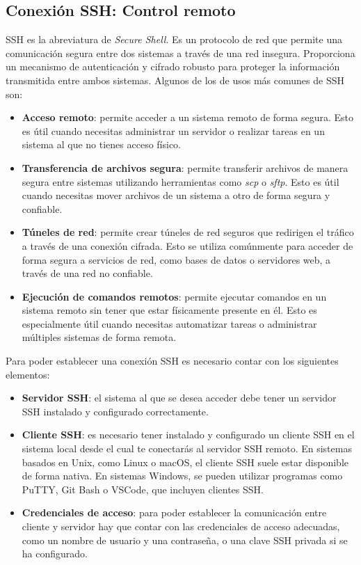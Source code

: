     \subsection{Conexión SSH: Control remoto}
    SSH \cite{wiki:ssh} es la abreviatura de \textit{Secure Shell}. Es un protocolo de red que permite una comunicación segura entre dos sistemas a través de una red insegura. Proporciona un mecanismo de autenticación y cifrado robusto para proteger la información transmitida entre ambos sistemas. Algunos de los de usos más comunes de SSH son:
    \begin{itemize}
        \item \textbf{Acceso remoto}: permite acceder a un sistema remoto de forma segura. Esto es útil cuando necesitas administrar un servidor o realizar tareas en un sistema al que no tienes acceso físico.
        \item \textbf{Transferencia de archivos segura}: permite transferir archivos de manera segura entre sistemas utilizando herramientas como \textit{scp} o \textit{sftp}. Esto es útil cuando necesitas mover archivos de un sistema a otro de forma segura y confiable.
        \item \textbf{Túneles de red}: permite crear túneles de red seguros que redirigen el tráfico a través de una conexión cifrada. Esto se utiliza comúnmente para acceder de forma segura a servicios de red, como bases de datos o servidores web, a través de una red no confiable. 
        \item \textbf{Ejecución de comandos remotos}: permite ejecutar comandos en un sistema remoto sin tener que estar físicamente presente en él. Esto es especialmente útil cuando necesitas automatizar tareas o administrar múltiples sistemas de forma remota.
    \end{itemize}
    Para poder establecer una conexión SSH es necesario contar con los siguientes elementos:
    \begin{itemize}
        \item \textbf{Servidor SSH}: el sistema al que se desea acceder debe tener un servidor SSH instalado y configurado correctamente.
        \item \textbf{Cliente SSH}: es necesario tener instalado y configurado un cliente SSH en el sistema local desde el cual te conectarás al servidor SSH remoto. En sistemas basados en Unix, como Linux o macOS, el cliente SSH suele estar disponible de forma nativa. En sistemas Windows, se pueden utilizar programas como PuTTY, Git Bash o VSCode, que incluyen clientes SSH. 
        \item \textbf{Credenciales de acceso}: para poder establecer la comunicación entre cliente y servidor hay que contar con las credenciales de acceso adecuadas, como un nombre de usuario y una contraseña, o una clave SSH privada si se ha configurado.
    \end{itemize}
    
